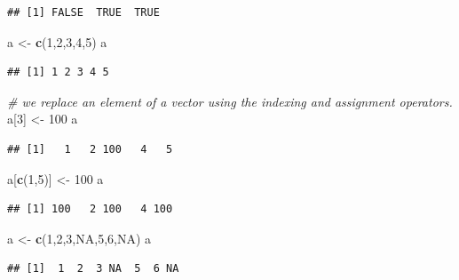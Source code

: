 \documentclass[]{book}
\newenvironment{Shaded}{\begin{snugshade}}{\end{snugshade}}
\newcommand{\CommentTok}[1]{\textcolor[rgb]{0.56,0.35,0.01}{\textit{#1}}}
\newcommand{\DecValTok}[1]{\textcolor[rgb]{0.00,0.00,0.81}{#1}}
\newcommand{\KeywordTok}[1]{\textcolor[rgb]{0.13,0.29,0.53}{\textbf{#1}}}
\newcommand{\NormalTok}[1]{#1}
\newcommand{\OtherTok}[1]{\textcolor[rgb]{0.56,0.35,0.01}{#1}}
\newcommand{\StringTok}[1]{\textcolor[rgb]{0.31,0.60,0.02}{#1}}
\begin{document}
\begin{verbatim}
## [1] FALSE  TRUE  TRUE
\end{verbatim}

\begin{Shaded}
\begin{Highlighting}[]
\NormalTok{a <-}\StringTok{ }\KeywordTok{c}\NormalTok{(}\DecValTok{1}\NormalTok{,}\DecValTok{2}\NormalTok{,}\DecValTok{3}\NormalTok{,}\DecValTok{4}\NormalTok{,}\DecValTok{5}\NormalTok{)}
\NormalTok{a}
\end{Highlighting}
\end{Shaded}

\begin{verbatim}
## [1] 1 2 3 4 5
\end{verbatim}

\begin{Shaded}
\begin{Highlighting}[]
\CommentTok{# we replace an element of a vector using the indexing and assignment operators. }
\NormalTok{a[}\DecValTok{3}\NormalTok{] <-}\StringTok{ }\DecValTok{100}
\NormalTok{a}
\end{Highlighting}
\end{Shaded}

\begin{verbatim}
## [1]   1   2 100   4   5
\end{verbatim}

\begin{Shaded}
\begin{Highlighting}[]
\NormalTok{a[}\KeywordTok{c}\NormalTok{(}\DecValTok{1}\NormalTok{,}\DecValTok{5}\NormalTok{)] <-}\StringTok{ }\DecValTok{100}
\NormalTok{a}
\end{Highlighting}
\end{Shaded}

\begin{verbatim}
## [1] 100   2 100   4 100
\end{verbatim}

\begin{Shaded}
\begin{Highlighting}[]
\NormalTok{a <-}\StringTok{ }\KeywordTok{c}\NormalTok{(}\DecValTok{1}\NormalTok{,}\DecValTok{2}\NormalTok{,}\DecValTok{3}\NormalTok{,}\OtherTok{NA}\NormalTok{,}\DecValTok{5}\NormalTok{,}\DecValTok{6}\NormalTok{,}\OtherTok{NA}\NormalTok{)}
\NormalTok{a}
\end{Highlighting}
\end{Shaded}

\begin{verbatim}
## [1]  1  2  3 NA  5  6 NA
\end{verbatim}
\end{document}
